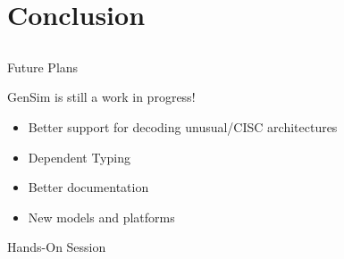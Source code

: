 \section{Conclusion}
\subsection{}

\begin{frame}{Future Plans}

GenSim is still a work in progress!

\begin{itemize}
\item Better support for decoding unusual/CISC architectures
\item Dependent Typing
\item Better documentation
\item New models and platforms
\end{itemize}

\end{frame}

\begin{frame}{Hands-On Session}

\end{frame}
